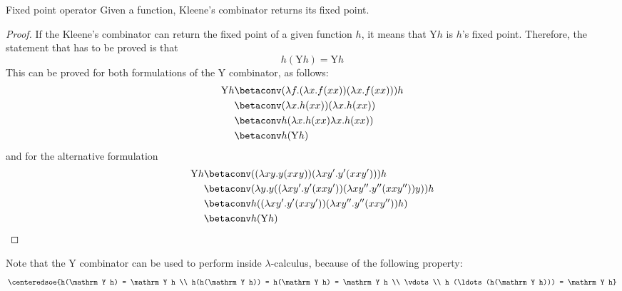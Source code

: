 \documentclass[a4paper, 12pt]{report}
\begin{document}
    \begin{framedprop}{Fixed point operator}
        Given a function, Kleene's combinator returns its fixed point.
    \end{framedprop}

    \begin{proof}
        If the Kleene's combinator can return the fixed point of a given function $h$, it means that $\mathrm Y h$ is $h$'s fixed point. Therefore, the statement that has to be proved is that $$h (\mathrm Y h) = \mathrm Y h$$ This can be proved for both formulations of the $\mathrm Y$ combinator, as follows:
        \begin{equation*}
            \begin{split}
                \mathrm Y h &\betaconv (\lambda f .(\lambda x.f(xx)) (\lambda x.f(xx))) h \\
                            &\betaconv (\lambda x.h(xx))(\lambda x.h(xx)) \\
                            &\betaconv h(\lambda x.h(xx) \lambda x. h(xx)) \\
                            &\betaconv h (\mathrm Y h)
            \end{split}
        \end{equation*}
        and for the alternative formulation
        \begin{equation*}
            \begin{split}
                \mathrm Y h &\betaconv ((\lambda xy.y(xxy))(\lambda xy'.y'(xxy')))h \\
                            &\betaconv (\lambda y.y ((\lambda xy'.y'(xxy'))(\lambda xy''.y''(xxy''))y))h \\
                            &\betaconv h ((\lambda xy'.y'(xxy'))(\lambda xy''.y''(xxy''))h) \\
                            &\betaconv h(\mathrm Y h)
            \end{split}
        \end{equation*}
    \end{proof}

    Note that the $\mathrm Y$ combinator can be used to perform  inside $\lambda$-calculus, because of the following property: $$\centeredsoe{h(\mathrm Y h) = \mathrm Y h \\ h(h(\mathrm Y h)) = h(\mathrm Y h) = \mathrm Y h \\ \vdots \\ h (\ldots (h(\mathrm Y h))) = \mathrm Y h}$$
\end{document}
